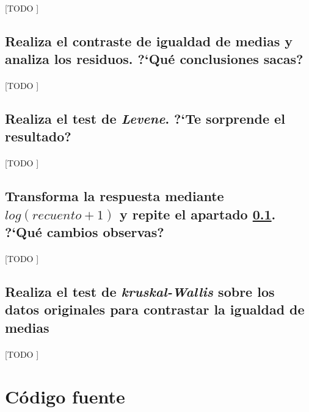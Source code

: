 \documentclass[11pt]{article}
\begin{document}
      \paragraph{}
      [TODO ]


    \subsection{Realiza el contraste de igualdad de medias y analiza los residuos. ?`Qué conclusiones sacas?}
    \label{sec:e2}

      \paragraph{}
      [TODO ]


    \subsection{Realiza el test de \emph{Levene}. ?`Te sorprende el resultado?}
    \label{sec:e3}

      \paragraph{}
      [TODO ]


    \subsection{Transforma la respuesta mediante $log(recuento + 1)$ y repite el apartado \ref{sec:e2}. ?`Qué cambios observas?}
    \label{sec:e4}

      \paragraph{}
      [TODO ]


    \subsection{Realiza el test de \emph{kruskal-Wallis} sobre los datos originales para contrastar la igualdad de medias}
    \label{sec:e5}
      \paragraph{}
      [TODO ]

  \section{Código fuente}
  \label{sec:code}
\end{document}
